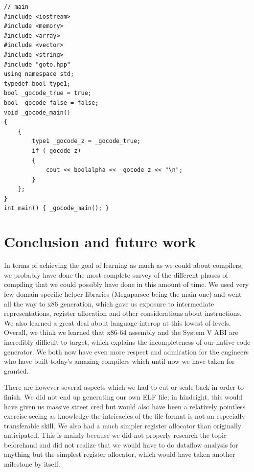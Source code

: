 \documentclass[letterpaper,11pt]{article}
\begin{document}
\begin{verbatim}
// main
#include <iostream>
#include <memory>
#include <array>
#include <vector>
#include <string>
#include "goto.hpp"
using namespace std;
typedef bool type1;
bool _gocode_true = true;
bool _gocode_false = false;
void _gocode_main()
{
    {
        type1 _gocode_z = _gocode_true;
        if (_gocode_z)
        {
            cout << boolalpha << _gocode_z << "\n";
        }
    };
}
int main() { _gocode_main(); }
\end{verbatim}
\section{Conclusion and future work}

In terms of achieving the goal of learning as much as we could about compilers, we probably have done the most complete survey of the different phases of compiling that we could possibly have done in this amount of time. We used very few domain-specific helper libraries (Megaparsec being the main one) and went all the way to x86 generation, which gave us exposure to intermediate representations, register allocation and other considerations about instructions. We also learned a great deal about language interop at this lowest of levels. Overall, we think we learned that x86-64 assembly and the System V ABI are incredibly difficult to target, which explains the incompleteness of our native code generator. We both now have even more respect and admiration for the engineers who have built today's amazing compilers which until now we have taken for granted.

There are however several aspects which we had to cut or scale back in order to finish. We did not end up generating our own ELF file; in hindsight, this would have given us massive street cred but would also have been a relatively pointless exercise seeing as knowledge the intricacies of the file format is not an especially transferable skill. We also had a much simpler register allocator than originally anticipated. This is mainly because we did not properly research the topic beforehand and did not realize that we would have to do dataflow analysis for anything but the simplest register allocator, which would have taken another milestone by itself.
\end{document}
